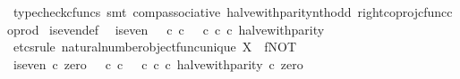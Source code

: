 \begin{isabellebody}
\ {\isacharparenleft}{\kern0pt}typecheck{\isacharunderscore}{\kern0pt}cfuncs{\isacharcomma}{\kern0pt}\ smt\ comp{\isacharunderscore}{\kern0pt}associative{}\ halve{\isacharunderscore}{\kern0pt}with{\isacharunderscore}{\kern0pt}parity{\isacharunderscore}{\kern0pt}nth{\isacharunderscore}{\kern0pt}odd\ right{\isacharunderscore}{\kern0pt}coproj{\isacharunderscore}{\kern0pt}cfunc{\isacharunderscore}{\kern0pt}coprod{\isacharparenright}{\kern0pt}%
\endisatagproof
{\isafoldproof}%
%
\isadelimproof
\isanewline
%
\endisadelimproof
\isanewline
{}\isamarkupfalse%
\ is{\isacharunderscore}{\kern0pt}even{\isacharunderscore}{\kern0pt}def{}{\isacharcolon}{\kern0pt}\isanewline
\ \ {\isachardoublequoteopen}is{\isacharunderscore}{\kern0pt}even\ {\isacharequal}{\kern0pt}\ {\isacharparenleft}{\kern0pt}{\isacharparenleft}{\kern0pt}{\isasymt}\ {\isasymcirc}\isactrlsub c\ {\isasymbeta}\isactrlbsub {\isasymnat}\isactrlsub c\isactrlesub {\isacharparenright}{\kern0pt}\ {\isasymamalg}\ {\isacharparenleft}{\kern0pt}{\isasymf}\ {\isasymcirc}\isactrlsub c\ {\isasymbeta}\isactrlbsub {\isasymnat}\isactrlsub c\isactrlesub {\isacharparenright}{\kern0pt}{\isacharparenright}{\kern0pt}\ {\isasymcirc}\isactrlsub c\ halve{\isacharunderscore}{\kern0pt}with{\isacharunderscore}{\kern0pt}parity{\isachardoublequoteclose}\isanewline
%
\isadelimproof
%
\endisadelimproof
%
\isatagproof
{}\isamarkupfalse%
\ {\isacharparenleft}{\kern0pt}etcs{\isacharunderscore}{\kern0pt}rule\ natural{\isacharunderscore}{\kern0pt}number{\isacharunderscore}{\kern0pt}object{\isacharunderscore}{\kern0pt}func{\isacharunderscore}{\kern0pt}unique{\isacharbrackleft}{\kern0pt}\ X{\isacharequal}{\kern0pt}{\isasymOmega}{\isacharcomma}{\kern0pt}\ \ f{\isacharequal}{\kern0pt}NOT{\isacharbrackright}{\kern0pt}{\isacharparenright}{\kern0pt}\isanewline
\ \ \isamarkupfalse%
\ {\isachardoublequoteopen}is{\isacharunderscore}{\kern0pt}even\ {\isasymcirc}\isactrlsub c\ zero\ {\isacharequal}{\kern0pt}\ {\isacharparenleft}{\kern0pt}{\isacharparenleft}{\kern0pt}{\isasymt}\ {\isasymcirc}\isactrlsub c\ {\isasymbeta}\isactrlbsub {\isasymnat}\isactrlsub c\isactrlesub {\isacharparenright}{\kern0pt}\ {\isasymamalg}\ {\isacharparenleft}{\kern0pt}{\isasymf}\ {\isasymcirc}\isactrlsub c\ {\isasymbeta}\isactrlbsub {\isasymnat}\isactrlsub c\isactrlesub {\isacharparenright}{\kern0pt}\ {\isasymcirc}\isactrlsub c\ halve{\isacharunderscore}{\kern0pt}with{\isacharunderscore}{\kern0pt}parity{\isacharparenright}{\kern0pt}\ {\isasymcirc}\isactrlsub c\ zero{\isachardoublequoteclose}\isanewline

\end{isabellebody}
